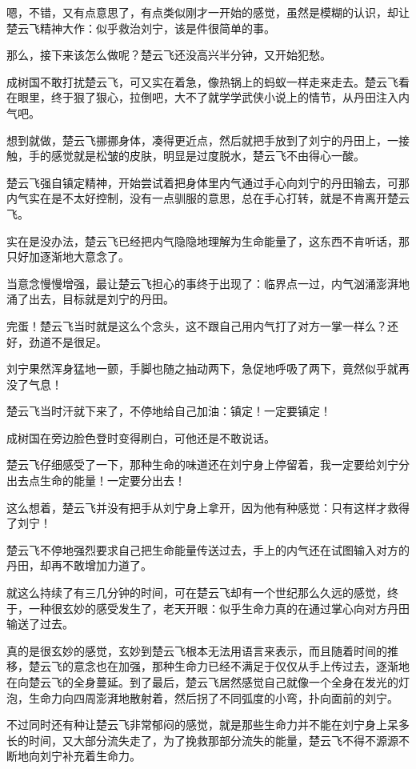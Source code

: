嗯，不错，又有点意思了，有点类似刚才一开始的感觉，虽然是模糊的认识，却让楚云飞精神大作：似乎救治刘宁，该是件很简单的事。

那么，接下来该怎么做呢？楚云飞还没高兴半分钟，又开始犯愁。

成树国不敢打扰楚云飞，可又实在着急，像热锅上的蚂蚁一样走来走去。楚云飞看在眼里，终于狠了狠心，拉倒吧，大不了就学学武侠小说上的情节，从丹田注入内气吧。

想到就做，楚云飞挪挪身体，凑得更近点，然后就把手放到了刘宁的丹田上，一接触，手的感觉就是松皱的皮肤，明显是过度脱水，楚云飞不由得心一酸。

楚云飞强自镇定精神，开始尝试着把身体里内气通过手心向刘宁的丹田输去，可那内气实在是不太好控制，没有一点驯服的意思，总在手心打转，就是不肯离开楚云飞。

实在是没办法，楚云飞已经把内气隐隐地理解为生命能量了，这东西不肯听话，那只好加逐渐地大意念了。

当意念慢慢增强，最让楚云飞担心的事终于出现了：临界点一过，内气汹涌澎湃地涌了出去，目标就是刘宁的丹田。

完蛋！楚云飞当时就是这么个念头，这不跟自己用内气打了对方一掌一样么？还好，劲道不是很足。

刘宁果然浑身猛地一颤，手脚也随之抽动两下，急促地呼吸了两下，竟然似乎就再没了气息！

楚云飞当时汗就下来了，不停地给自己加油：镇定！一定要镇定！

成树国在旁边脸色登时变得刷白，可他还是不敢说话。

楚云飞仔细感受了一下，那种生命的味道还在刘宁身上停留着，我一定要给刘宁分出去点生命的能量！一定要分出去！

这么想着，楚云飞并没有把手从刘宁身上拿开，因为他有种感觉：只有这样才救得了刘宁！

楚云飞不停地强烈要求自己把生命能量传送过去，手上的内气还在试图输入对方的丹田，却再不敢增加力道了。

就这么持续了有三几分钟的时间，可在楚云飞却有一个世纪那么久远的感觉，终于，一种很玄妙的感受发生了，老天开眼：似乎生命力真的在通过掌心向对方丹田输送了过去。

真的是很玄妙的感觉，玄妙到楚云飞根本无法用语言来表示，而且随着时间的推移，楚云飞的意念也在加强，那种生命力已经不满足于仅仅从手上传过去，逐渐地在向楚云飞的全身蔓延。到了最后，楚云飞居然感觉自己就像一个全身在发光的灯泡，生命力向四周澎湃地散射着，然后拐了不同弧度的小弯，扑向面前的刘宁。

不过同时还有种让楚云飞非常郁闷的感觉，就是那些生命力并不能在刘宁身上呆多长的时间，又大部分流失走了，为了挽救那部分流失的能量，楚云飞不得不源源不断地向刘宁补充着生命力。

